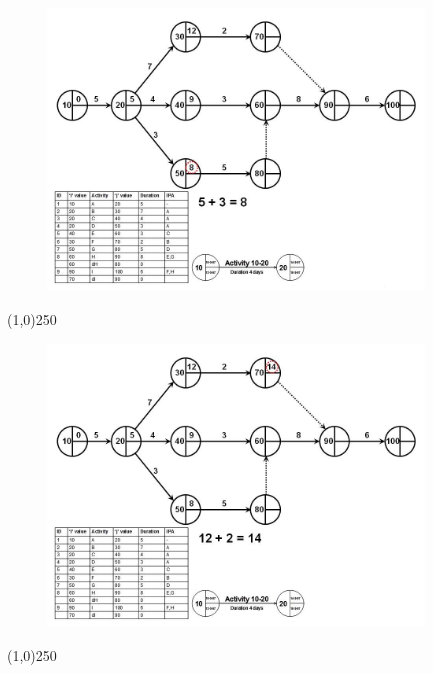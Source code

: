 \begin{frame}
\begin{figure}
	\centering
		\includegraphics[width = 10.0cm]{oldnotes/Slide105.jpg}
\end{figure}
\end{frame}
\begin{center}\line(1,0){250}\end{center}


\begin{frame}
\begin{figure}
	\centering
		\includegraphics[width = 10.0cm]{oldnotes/Slide106.jpg}
\end{figure}
\end{frame}
\begin{center}\line(1,0){250}\end{center}


